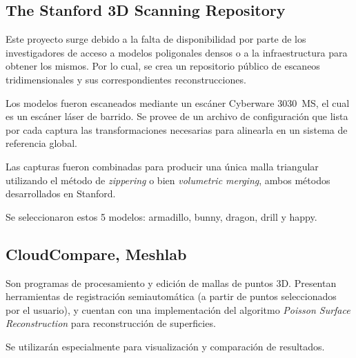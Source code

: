 		\subsection{The Stanford 3D Scanning Repository}

			Este proyecto surge debido a la falta de disponibilidad
			por parte de los investigadores
			de acceso a modelos poligonales densos
				o a la infraestructura para obtener los mismos.
			Por lo cual, se crea un repositorio público de
			escaneos tridimensionales y sus correspondientes reconstrucciones.

			Los modelos fueron escaneados mediante un escáner Cyberware 3030~MS,
			el cual es un escáner láser de barrido.
			Se provee de un archivo de configuración que lista por cada captura
			las transformaciones necesarias para alinearla en un sistema de
			referencia global.

			Las capturas fueron combinadas para producir una única malla
			triangular utilizando el método de \emph{zippering} o bien
			\emph{volumetric merging}, ambos métodos desarrollados en Stanford.\cite{StanfordScanRep}


			Se seleccionaron estos 5 modelos: armadillo, bunny, dragon, drill y happy.

		\subsection{CloudCompare, Meshlab}
			Son programas de procesamiento y edición de mallas de puntos 3D.
			Presentan herramientas de registración semiautomática (a partir de
			puntos seleccionados por el usuario), y cuentan con una
			implementación del algoritmo \emph{Poisson Surface Reconstruction}
			para reconstrucción de superficies.

			Se utilizarán especialmente para visualización
			y comparación de resultados.





